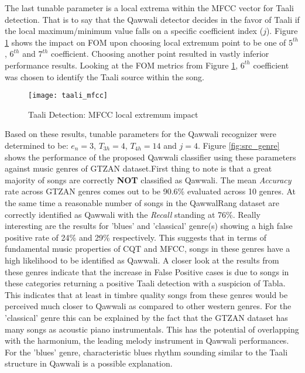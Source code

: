 \documentclass{article}
\begin{document}
The last tunable parameter is a local extrema within the MFCC vector for Taali detection. That is to say that the Qawwali detector decides in the favor of Taali if the local maximum/minimum value falls on a specific coefficient index ($j$). Figure \ref{fig:src_mfcc} shows the impact on FOM upon choosing local extremum point to be one of $5^{th}$, $6^{th}$ and $7^{th}$ coefficient. Choosing another point resulted in vastly inferior performance results. Looking at the FOM metrics from Figure \ref{fig:src_mfcc}, $6^{th}$ coefficient was chosen to identify the Taali source within the song.
\begin{figure}[htbp]
  \centering
  \texttt{[image: taali\_mfcc]}
  \caption{Taali Detection: MFCC local extremum impact}
\label{fig:src_mfcc}
\end{figure}

Based on these results, tunable parameters for the Qawwali recognizer were determined to be: $e_{n}=3$, $T_{3h}=4$, $T_{4h}=14$ and $j=4$. Figure \ref{fig:src_genre} shows the performance of the proposed Qawwali classifier using these parameters against music genres of GTZAN dataset.First thing to note is that a great majority of songs are correctly \textbf{NOT} classified as Qawwali. The mean \textit{Accuracy} rate across GTZAN genres comes out to be 90.6\% evaluated across 10 genres. At the same time a reasonable number of songs in the QawwalRang dataset are correctly identified as Qawwali with the \textit{Recall} standing at 76\%. Really interesting are the results for 'blues' and 'classical' genre(s) showing a high false positive rate of 24\% and 29\% respectively. This suggests that in terms of fundamental music properties of CQT and MFCC, songs in these genres have a high likelihood to be identified as Qawwali. A closer look at the results from these genres indicate that the increase in False Positive cases is due to songs in these categories returning a positive Taali detection with a suspicion of Tabla. This indicates that at least in timbre quality songs from these genres would be perceived much closer to Qawwali as compared to other western genres. For the 'classical' genre this can be explained by the fact that the GTZAN dataset has many songs as acoustic piano instrumentals. This has the potential of overlapping with the  harmonium, the leading melody instrument in Qawwali performances. For the 'blues' genre, characteristic blues rhythm sounding similar to the Taali structure in Qawwali is a possible explanation. 
\end{document}
